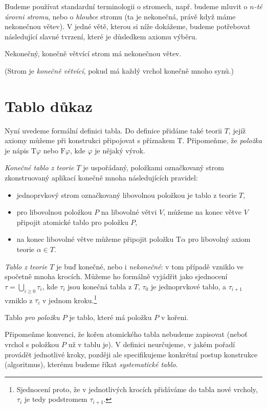 Budeme používat standardní terminologii o stromech, např. budeme mluvit o \emph{$n$-té úrovni stromu}, nebo o \emph{hloubce} stromu (ta je nekonečná, právě když máme nekonečnou větev). V jedné větě, kterou si níže dokážeme, budeme potřebovat následující slavné tvrzení, které je důsledkem axiomu výběru. 

\begin{lemma}
Nekonečný, konečně větvící strom má nekonečnou větev.
\end{lemma}
\noindent (Strom je \emph{konečně větvící}, pokud má každý vrchol konečně mnoho synů.)


\section{Tablo důkaz}

Nyní uvedeme formální definici tabla. Do definice přidáme také teorii $T$, jejíž axiomy můžeme při konstrukci připojovat s příznakem $\mathrm{T}$. Připomeňme, že \emph{položka} je nápis $\mathrm{T}\varphi$ nebo $\mathrm{F}\varphi$, kde $\varphi$ je nějaký výrok.

\begin{definition}[Tablo]
\emph{Konečné tablo z teorie $T$} je uspořádaný, položkami označkovaný strom zkonstruovaný aplikací konečně mnoha následujících pravidel:
\begin{itemize}
    \item jednoprvkový strom označkovaný libovolnou položkou je tablo z teorie $T$,
    \item pro libovolnou položkou $P$ na libovolné větvi $V$, můžeme na konec větve $V$ připojit atomické tablo pro položku $P$,
    \item na konec libovolné větve můžeme připojit položku $\mathrm{T}\alpha$ pro libovolný axiom teorie $\alpha\in T$.
\end{itemize}
\emph{Tablo z teorie $T$} je buď konečné, nebo i \emph{nekonečné}: v tom případě vzniklo ve spočetně mnoha krocích. Můžeme ho formálně vyjádřit jako sjednocení $\tau=\bigcup_{i\geq 0}\tau_i$, kde $\tau_i$ jsou konečná tabla z $T$, $\tau_0$ je jednoprvkové tablo, a $\tau_{i+1}$ vzniklo z $\tau_i$ v jednom kroku.\footnote{Sjednocení proto, že v jednotlivých krocích přidáváme do tabla nové vrcholy, $\tau_i$ je tedy podstromem $\tau_{i+1}$.}

Tablo \emph{pro položku $P$} je tablo, které má položku $P$ v kořeni.
\end{definition}

Připomeňme konvenci, že kořen atomického tabla nebudeme zapisovat (neboť vrchol s položkou $P$ už v tablu je). V definici neurčujeme, v jakém pořadí provádět jednotlivé kroky, později ale specifikujeme konkrétní postup konstrukce (algoritmus), kterému budeme říkat \emph{systematické tablo}. 


